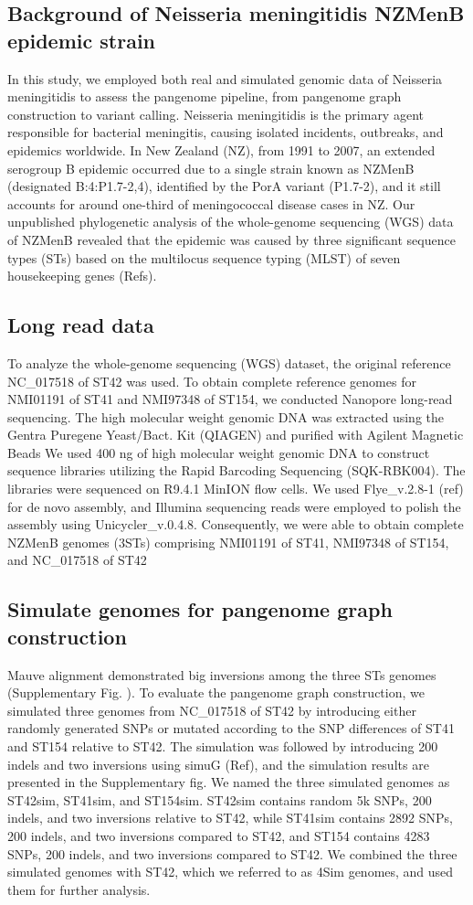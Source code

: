 
\subsection{Background of Neisseria meningitidis NZMenB epidemic strain}
In this study, we employed both real and simulated genomic data of Neisseria meningitidis to assess the pangenome pipeline, from pangenome graph construction to variant calling. Neisseria meningitidis is the primary agent responsible for bacterial meningitis, causing isolated incidents, outbreaks, and epidemics worldwide. In New Zealand (NZ), from 1991 to 2007, an extended serogroup B epidemic occurred due to a single strain known as NZMenB (designated B:4:P1.7-2,4), identified by the PorA variant (P1.7-2), and it still accounts for around one-third of meningococcal disease cases in NZ.  Our unpublished phylogenetic analysis of the whole-genome sequencing (WGS) data of NZMenB revealed that the epidemic was caused by three significant sequence types (STs) based on the multilocus sequence typing (MLST) of seven housekeeping genes (Refs).
\subsection{Long read data}
To analyze the whole-genome sequencing (WGS) dataset, the original reference NC_017518 of ST42 was used. To obtain complete reference genomes for NMI01191 of ST41 and NMI97348 of ST154, we conducted Nanopore long-read sequencing. The high molecular weight genomic DNA was extracted using the Gentra Puregene Yeast/Bact. Kit (QIAGEN) and purified with Agilent Magnetic Beads We used 400 ng of high molecular weight genomic DNA to construct sequence libraries utilizing the Rapid Barcoding Sequencing (SQK-RBK004). The libraries were sequenced on R9.4.1 MinION flow cells. We used Flye_v.2.8-1 (ref) for de novo assembly, and Illumina sequencing reads were employed to polish the assembly using Unicycler_v.0.4.8. Consequently, we were able to obtain complete NZMenB genomes (3STs) comprising NMI01191 of ST41, NMI97348 of ST154, and NC_017518 of ST42
\subsection{Simulate genomes for pangenome graph construction}
Mauve alignment demonstrated big inversions among the three STs genomes (Supplementary Fig. ).  To evaluate the pangenome graph construction, we simulated three genomes from NC_017518 of ST42 by introducing either randomly generated SNPs or mutated according to the SNP differences of ST41 and ST154 relative to ST42. The simulation was followed by introducing 200 indels and two inversions using simuG (Ref), and the simulation results are presented in the Supplementary fig. We named the three simulated genomes as ST42sim, ST41sim, and ST154sim. ST42sim contains random 5k SNPs, 200 indels, and two inversions relative to ST42, while ST41sim contains 2892 SNPs, 200 indels, and two inversions compared to ST42, and ST154 contains 4283 SNPs, 200 indels, and two inversions compared to ST42. We combined the three simulated genomes with ST42, which we referred to as 4Sim genomes, and used them for further analysis.

